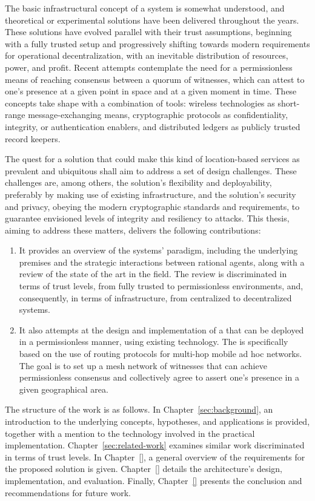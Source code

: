 The basic infrastructural concept of a \pol{} system is somewhat understood, and theoretical or experimental solutions have been delivered throughout the years. These solutions have evolved parallel with their trust assumptions, beginning with a fully trusted setup and progressively shifting towards modern requirements for operational decentralization, with an inevitable distribution of resources, power, and profit. Recent attempts contemplate the need for a permissionless means of reaching consensus between a quorum of witnesses, which can attest to one's presence at a given point in space and at a given moment in time. These concepts take shape with a combination of tools: wireless technologies as short-range message-exchanging means, cryptographic protocols as confidentiality, integrity, or authentication enablers, and distributed ledgers as publicly trusted record keepers. 

The quest for a solution that could make this kind of location-based services as prevalent and ubiquitous shall aim to address a set of design challenges. These challenges are, among others, the solution's flexibility and deployability, preferably by making use of existing infrastructure, and the solution's security and privacy, obeying the modern cryptographic standards and requirements, to guarantee envisioned levels of integrity and resiliency to attacks. This thesis, aiming to address these matters, delivers the following contributions:
\begin{enumerate}
\item It provides an overview of the \pol{} systems' paradigm, including the underlying premises and the strategic interactions between rational agents, along with a review of the state of the art in the field. The review is discriminated in terms of trust levels, from fully trusted to permissionless environments, and, consequently, in terms of infrastructure, from centralized to decentralized systems.
\item It also attempts at the design and implementation of a \poc{} that can be deployed in a permissionless manner, using existing technology. The \poc{} is specifically based on the use of routing protocols for multi-hop mobile ad hoc networks. The goal is to set up a mesh network of witnesses that can achieve permissionless consensus and collectively agree to assert one's presence in a given geographical area.
\end{enumerate}

The structure of the work is as follows. In Chapter~\ref{sec:background}, an introduction to the underlying concepts, hypotheses, and applications is provided, together with a mention to the technology involved in the practical implementation. Chapter~\ref{sec:related-work} examines similar work discriminated in terms of trust levels. In Chapter~\ref{}, a general overview of the requirements for the proposed solution is given. Chapter~\ref{} details the architecture's design, implementation, and evaluation. Finally, Chapter~\ref{} presents the conclusion and recommendations for future work.
